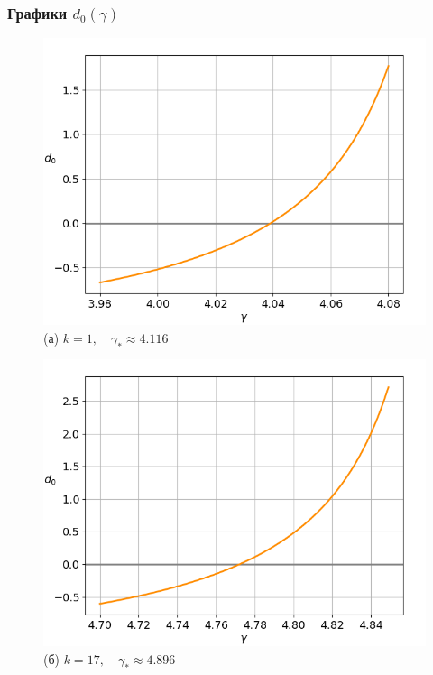 \documentclass[fullscreen=true, unicode, bookmarks=false]{beamer}
\begin{document}
\begin{frame}
\frametitle{ Графики $ d_0(\gamma) $ }

\begin{figure} 
\begin{minipage}[h]{0.49\linewidth}
\begin{center}
\includegraphics[scale=0.39]{divergent_d0_000.png} \\ (а) $ k=1, \quad \gamma_*\approx 4.116 $
\end{center}
\end{minipage} 
\hfill
\begin{minipage}[h]{0.49\linewidth}
\begin{center}
\includegraphics[scale=0.39]{divergent_d0_033.png}  \\ (б) $ k=17, \quad \gamma_*\approx 4.896 $
\end{center}
\end{minipage} 
\end{figure}

\end{frame}
\end{document}
